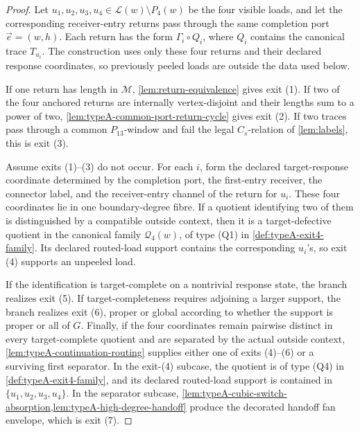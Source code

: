 \documentclass[11pt]{article}
\newcommand{\Mers}{\mathcal M}
\begin{document}
\begin{proof}
Let \(u_1,u_2,u_3,u_4\in\mathcal L(w)\setminus P_4(w)\) be the four visible
loads, and let the corresponding receiver-entry returns pass through the same
completion port \(\vec e=(w,h)\).  Each return has the form \(\Gamma_i\circ Q_i\),
where \(Q_i\) contains the canonical trace \(T_{u_i}\).  The construction uses
only these four returns and their declared response coordinates, so previously
peeled loads are outside the data used below.

If one return has length in \(\Mers\), \cref{lem:return-equivalence} gives exit
(1).  If two of the four anchored returns are internally vertex-disjoint and
their lengths sum to a power of two, \cref{lem:typeA-common-port-return-cycle}
gives exit (2).  If two traces pass through a common \(P_{13}\)-window and fail
the legal \(C_s\)-relation of \cref{lem:labels}, this is exit (3).

Assume exits (1)--(3) do not occur.  For each \(i\), form the declared
target-response coordinate determined by the completion port, the first-entry
receiver, the connector label, and the receiver-entry channel of the return for
\(u_i\).  These four coordinates lie in one boundary-degree fibre.  If a
quotient identifying two of them is distinguished by a compatible outside
context, then it is a target-defective quotient in the canonical family
\(\mathcal Q_4(w)\), of type \textup{(Q1)} in
\cref{def:typeA-exit4-family}.  Its declared routed-load support contains the
corresponding \(u_i\)'s, so exit (4) supports an unpeeled load.

If the identification is target-complete on a nontrivial response state, the
branch realizes exit (5).  If target-completeness requires adjoining a larger
support, the branch realizes exit (6), proper or global according to whether the
support is proper or all of \(G\).  Finally, if the four coordinates remain
pairwise distinct in every target-complete quotient and are separated by the
actual outside context, \cref{lem:typeA-continuation-routing} supplies either
one of exits (4)--(6) or a surviving first separator.  In the exit-(4) subcase,
the quotient is of type \textup{(Q4)} in \cref{def:typeA-exit4-family}, and its
declared routed-load support is contained in
\(\{u_1,u_2,u_3,u_4\}\).  In the separator subcase,
\cref{lem:typeA-cubic-switch-absorption,lem:typeA-high-degree-handoff} produce
the decorated handoff fan envelope, which is exit (7).
\end{proof}
\end{document}
